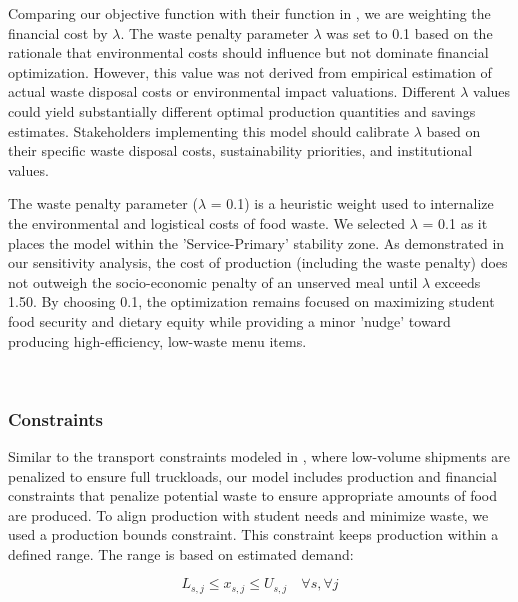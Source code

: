 \documentclass[journal]{IEEEtran}
\begin{document}
Comparing our objective function with their function in \cite{py_milp}, we are weighting the financial cost by $\lambda$. The waste penalty parameter $\lambda$ was set to 0.1 based on the rationale that environmental costs should influence but not dominate financial optimization. However, this value was not derived from empirical estimation of actual waste disposal costs or environmental impact valuations. Different $\lambda$ values could yield substantially different optimal production quantities and savings estimates. Stakeholders implementing this model should calibrate $\lambda$ based on their specific waste disposal costs, sustainability priorities, and institutional values.

The waste penalty parameter ($\lambda$ = 0.1) is a heuristic weight used to internalize the environmental and logistical costs of food waste. We selected $\lambda$ = 0.1 as it places the model within the 'Service-Primary' stability zone. As demonstrated in our sensitivity analysis, the cost of production (including the waste penalty) does not outweigh the socio-economic penalty of an unserved meal until $\lambda$ exceeds 1.50. By choosing 0.1, the optimization remains focused on maximizing student food security and dietary equity while providing a minor 'nudge' toward producing high-efficiency, low-waste menu items.

\

\subsubsection{Constraints}
Similar to the transport constraints modeled in \cite{boujelben}, where low-volume shipments are penalized to ensure full truckloads, our model includes production and financial constraints that penalize potential waste to ensure appropriate amounts of food are produced. To align production with student needs and minimize waste, we used a production bounds constraint. This constraint keeps production within a defined range. The range is based on estimated demand:

\begin{equation}
    L_{s,j} \leq x_{s,j} \leq U_{s,j} \quad \forall s, \forall j
    \label{eq:bounds}
\end{equation}
\end{document}
